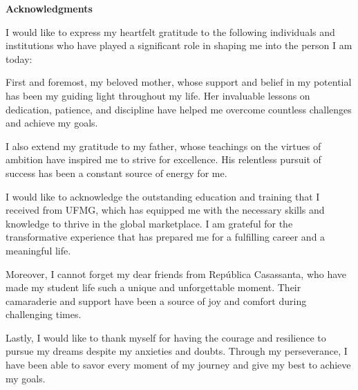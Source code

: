 
\begin{center}
\huge{{\bf Acknowledgments}}
\vspace{4cm}
\end{center}

I would like to express my heartfelt gratitude to the following individuals and institutions who have played a significant role in shaping me into the person I am today:

First and foremost, my beloved mother, whose support and belief in my potential has been my guiding light throughout my life. Her invaluable lessons on dedication, patience, and discipline have helped me overcome countless challenges and achieve my goals.

I also extend my gratitude to my father, whose teachings on the virtues of ambition have inspired me to strive for excellence. His relentless pursuit of success has been a constant source of energy for me.

I would like to acknowledge the outstanding education and training that I received from UFMG, which has equipped me with the necessary skills and knowledge to thrive in the global marketplace. I am grateful for the transformative experience that has prepared me for a fulfilling career and a meaningful life.

Moreover, I cannot forget my dear friends from República Casassanta, who have made my student life such a unique and unforgettable moment. Their camaraderie and support have been a source of joy and comfort during challenging times.

Lastly, I would like to thank myself for having the courage and resilience to pursue my dreams despite my anxieties and doubts. Through my perseverance, I have been able to savor every moment of my journey and give my best to achieve my goals.


\clearpage
\thispagestyle{empty}
\cleardoublepage